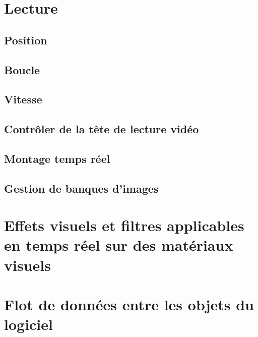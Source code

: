 \documentclass[
  french,
]{book}
\begin{document}
\hypertarget{lecture}{%
\section{Lecture}\label{lecture}}

\hypertarget{position-1}{%
\subsection{Position}\label{position-1}}

\hypertarget{boucle}{%
\subsection{Boucle}\label{boucle}}

\hypertarget{vitesse}{%
\subsection{Vitesse}\label{vitesse}}

\hypertarget{contruxf4ler-de-la-tuxeate-de-lecture-viduxe9o}{%
\subsection{Contrôler de la tête de lecture vidéo}\label{contruxf4ler-de-la-tuxeate-de-lecture-viduxe9o}}

\hypertarget{montage-temps-ruxe9el}{%
\subsection{Montage temps réel}\label{montage-temps-ruxe9el}}

\hypertarget{gestion-de-banques-dimages}{%
\subsection{Gestion de banques d'images}\label{gestion-de-banques-dimages}}

\hypertarget{effets-visuels-et-filtres-applicables-en-temps-ruxe9el-sur-des-matuxe9riaux-visuels}{%
\section{Effets visuels et filtres applicables en temps réel sur des matériaux visuels}\label{effets-visuels-et-filtres-applicables-en-temps-ruxe9el-sur-des-matuxe9riaux-visuels}}

\hypertarget{flot-de-donnuxe9es-entre-les-objets-du-logiciel}{%
\section{Flot de données entre les objets du logiciel}\label{flot-de-donnuxe9es-entre-les-objets-du-logiciel}}
\end{document}
